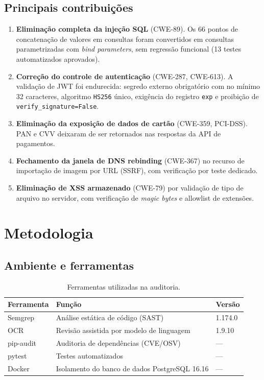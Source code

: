\documentclass[12pt,a4paper]{article}
\begin{document}
\subsection*{Principais contribuições}

\begin{enumerate}
  \item \textbf{Eliminação completa da injeção SQL} (CWE-89). Os 66 pontos de
  concatenação de valores em consultas foram convertidos em consultas
  parametrizadas com \textit{bind parameters}, sem regressão funcional
  (13 testes automatizados aprovados).
  \item \textbf{Correção do controle de autenticação} (CWE-287, CWE-613). A
  validação de JWT foi endurecida: segredo externo obrigatório com no mínimo
  32 caracteres, algoritmo \texttt{HS256} único, exigência do registro
  \texttt{exp} e proibição de \texttt{verify\_signature=False}.
  \item \textbf{Eliminação da exposição de dados de cartão} (CWE-359, PCI-DSS).
  PAN e CVV deixaram de ser retornados nas respostas da API de pagamentos.
  \item \textbf{Fechamento da janela de DNS rebinding} (CWE-367) no recurso de
  importação de imagem por URL (SSRF), com verificação por teste dedicado.
  \item \textbf{Eliminação de XSS armazenado} (CWE-79) por validação de tipo
  de arquivo no servidor, com verificação de \emph{magic bytes} e allowlist de
  extensões.
\end{enumerate}

\section{Metodologia}\label{sec:metodologia}

\subsection{Ambiente e ferramentas}

\begin{table}[H]
\centering
\caption{Ferramentas utilizadas na auditoria.}
\begin{tabularx}{\textwidth}{@{}lXl@{}}
\toprule
\textbf{Ferramenta} & \textbf{Função} & \textbf{Versão} \\
\midrule
Semgrep       & Análise estática de código (SAST)              & 1.174.0 \\
OCR           & Revisão assistida por modelo de linguagem      & 1.9.10 \\
pip-audit     & Auditoria de dependências (CVE/OSV)            & --- \\
pytest        & Testes automatizados                            & --- \\
Docker        & Isolamento do banco de dados PostgreSQL 16.16  & --- \\
\bottomrule
\end{tabularx}
\end{table}
\end{document}
